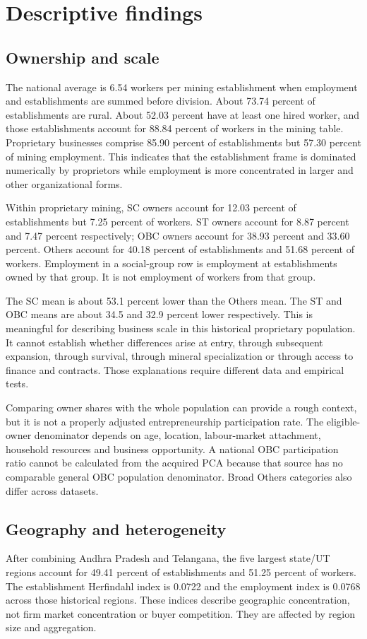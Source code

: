 \documentclass[11pt,a4paper]{report}
\begin{document}
\chapter{Descriptive findings}
\section{Ownership and scale}
The national average is 6.54 workers per mining establishment when employment and establishments are summed before division. About 73.74 percent of establishments are rural. About 52.03 percent have at least one hired worker, and those establishments account for 88.84 percent of workers in the mining table. Proprietary businesses comprise 85.90 percent of establishments but 57.30 percent of mining employment. This indicates that the establishment frame is dominated numerically by proprietors while employment is more concentrated in larger and other organizational forms.

Within proprietary mining, SC owners account for 12.03 percent of establishments but 7.25 percent of workers. ST owners account for 8.87 percent and 7.47 percent respectively; OBC owners account for 38.93 percent and 33.60 percent. Others account for 40.18 percent of establishments and 51.68 percent of workers. Employment in a social-group row is employment at establishments owned by that group. It is not employment of workers from that group.

The SC mean is about 53.1 percent lower than the Others mean. The ST and OBC means are about 34.5 and 32.9 percent lower respectively. This is meaningful for describing business scale in this historical proprietary population. It cannot establish whether differences arise at entry, through subsequent expansion, through survival, through mineral specialization or through access to finance and contracts. Those explanations require different data and empirical tests.

Comparing owner shares with the whole population can provide a rough context, but it is not a properly adjusted entrepreneurship participation rate. The eligible-owner denominator depends on age, location, labour-market attachment, household resources and business opportunity. A national OBC participation ratio cannot be calculated from the acquired PCA because that source has no comparable general OBC population denominator. Broad Others categories also differ across datasets.

\section{Geography and heterogeneity}
After combining Andhra Pradesh and Telangana, the five largest state/\allowbreak{}UT regions account for 49.41 percent of establishments and 51.25 percent of workers. The establishment Herfindahl index is 0.0722 and the employment index is 0.0768 across those historical regions. These indices describe geographic concentration, not firm market concentration or buyer competition. They are affected by region size and aggregation.
\end{document}
